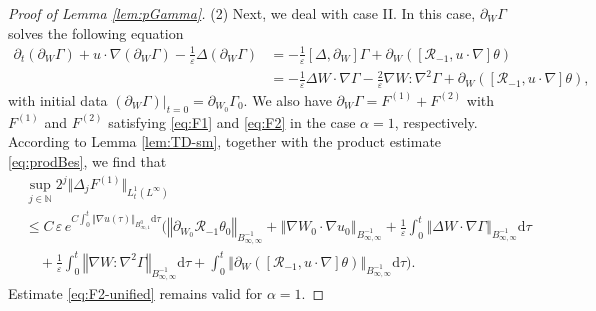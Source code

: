 \documentclass[reqno,11pt,a4paper]{amsart}
\newcommand{\dd}{\mathrm{d}}
\begin{document}
\begin{proof}[Proof of Lemma \ref{lem:pGamma}]
(2) Next, we deal with case II. 
In this case, $\partial_W \Gamma$ solves the following equation
\begin{align*}
  \partial_t\left(\partial_W \Gamma\right)+u \cdot \nabla\left(\partial_W \Gamma\right)
  -\frac{1}{\varepsilon}\Delta\left(\partial_W \Gamma\right)
  & =-\frac{1}{\varepsilon}\left[\Delta, \partial_W\right] \Gamma
  +\partial_W\left(\left[\mathcal{R}_{-1}, u \cdot \nabla\right] \theta\right) \\
  & =-\frac{1}{\varepsilon}\Delta W \cdot \nabla \Gamma-\frac{2}{\varepsilon} \nabla W: \nabla^2 \Gamma
  + \partial_W\left(\left[\mathcal{R}_{-1}, u \cdot \nabla\right] \theta\right),
\end{align*}
with initial data $(\partial_W \Gamma)|_{t=0} = \partial_{W_0}\Gamma_0$. 
We also have $\partial_W \Gamma = F^{(1)} + F^{(2)}$ with $F^{(1)}$ and $F^{(2)}$ satisfying \eqref{eq:F1} and \eqref{eq:F2} 
in the case $\alpha =1$, 
respectively. According to Lemma \ref{lem:TD-sm}, together with the product estimate \eqref{eq:prodBes}, 
we find that 
\begin{align*}
  & \sup_{j\in\mathbb{N}} 2^j \Vert \Delta_j F^{(1)}\Vert _{L^1_t(L^\infty)} \\
  & \leq C\, \varepsilon\, e^{C\int_0^t\Vert \nabla u(\tau)\Vert _{B^0_{\infty,1}} \dd \tau}
  \bigg(\left\Vert \partial_{W_0} \mathcal{R}_{-1}\theta_0\right\Vert _{B_{\infty, \infty}^{-1}} 
  + \left\Vert \nabla W_0\cdot\nabla u_0\right\Vert _{B_{\infty, \infty}^{-1}} 
  +\frac{1}{\varepsilon} \int_0^t\left\Vert \Delta W \cdot \nabla\Gamma\right\Vert _{B_{\infty, \infty}^{-1}} \dd \tau \\
  & \quad 
  +\frac{1}{\varepsilon} \int_0^t\left\Vert \nabla W: \nabla^2 \Gamma \right\Vert _{ B_{\infty, \infty}^{-1}}\dd \tau 
  +\int_0^t\left\Vert \partial_W\left(\left[\mathcal{R}_{-1}, u \cdot \nabla\right] 
  \theta\right)\right\Vert _{B_{\infty, \infty}^{-1}}
  \dd \tau \bigg).
\end{align*}
Estimate \eqref{eq:F2-unified} remains valid for $\alpha=1$.

\end{proof}
\end{document}
